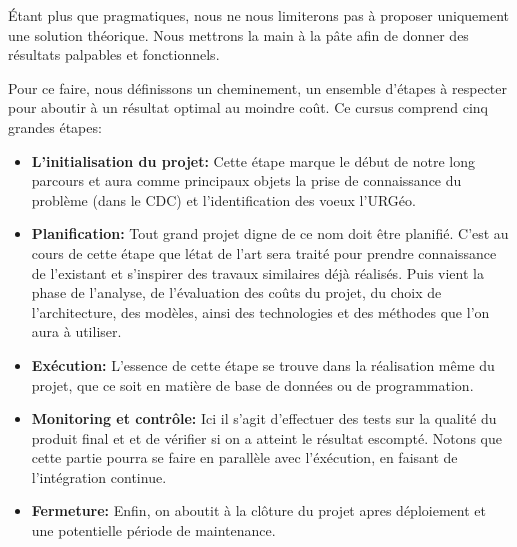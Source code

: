 \par
Étant plus que pragmatiques, nous ne nous limiterons pas à proposer 
uniquement une solution théorique. Nous mettrons la main à la pâte afin
de donner des résultats palpables et fonctionnels.
\par
Pour ce faire, nous définissons un cheminement, un ensemble d'étapes à 
respecter pour aboutir à un résultat optimal au moindre coût.
Ce cursus comprend cinq grandes étapes: 

\begin{itemize}
    \item \textbf{L'initialisation du projet: }
    Cette étape marque le début de notre long parcours et aura comme principaux
    objets la prise de connaissance du problème (dans le CDC) et l'identification des voeux
    l'URGéo.
    \item \textbf{Planification: }
    Tout grand projet digne de ce nom doit être planifié. C'est au cours de cette étape
    que létat de l'art sera traité pour prendre connaissance de l'existant et s'inspirer des travaux
    similaires déjà réalisés. Puis vient la phase de l'analyse, de l'évaluation des coûts du projet, 
    du choix  de l'architecture, des modèles,
    ainsi des technologies et des méthodes que l'on aura à utiliser.
    \item \textbf{Exécution: }
    L'essence de cette étape se trouve dans la réalisation même du projet, que ce soit en matière de base de 
    données ou de programmation.
    \item \textbf{Monitoring et contrôle: }
    Ici il s'agit d'effectuer des tests sur la qualité du produit final et et de vérifier si on a atteint le 
    résultat escompté. Notons que cette partie pourra se faire en parallèle avec l'éxécution, en faisant de 
    l'intégration continue.
    \item \textbf{Fermeture: }
    Enfin, on aboutit à la clôture du projet apres déploiement et une potentielle période de maintenance.


\end{itemize}  